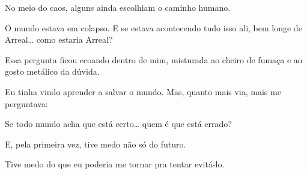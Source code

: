 No meio do caos, alguns ainda escolhiam o caminho humano.

O mundo estava em colapso.  
E se estava acontecendo tudo isso ali, bem longe de Arreal…
como estaria Arreal?

Essa pergunta ficou ecoando dentro de mim, misturada ao cheiro de fumaça e ao gosto metálico da dúvida.

Eu tinha vindo aprender a salvar o mundo.  
Mas, quanto mais via, mais me perguntava:

Se todo mundo acha que está certo…  
quem é que está errado?

E, pela primeira vez, tive medo não só do futuro.

Tive medo do que eu poderia me tornar pra tentar evitá-lo.

